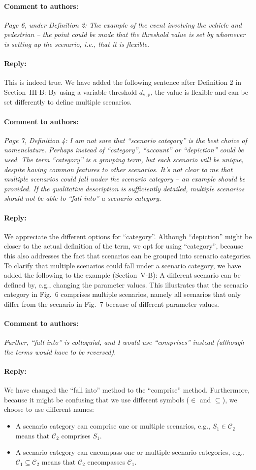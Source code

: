 \documentclass[10pt,final,a4paper,oneside,onecolumn]{article}
\newcommand{\toauthor}{\paragraph*{Comment to authors:} \itshape}
\newcommand{\fromauthor}{\paragraph*{Reply:} \normalfont}
\newcommand{\cstart}{\cbstart\color{red}}
\newcommand{\cend}{\cbend\color{black}}
\newcommand{\distancecondition}{d_{\mathrm{v,p}}}
\newcommand{\scenario}{S}
\newcommand{\scenarioa}{\scenario_{1}}
\newcommand{\scenariofallsinto}{\in}
\newcommand{\scenariocategory}{\mathcal{C}}
\newcommand{\scenariocategorya}{\scenariocategory_{1}}
\newcommand{\scenariocategoryb}{\scenariocategory_{2}}
\newcommand{\scenariocategoryfallsinto}{\subseteq}
\begin{document}
\toauthor Page 6, under Definition 2: The example of the event involving the vehicle and pedestrian -- the point could be made that the threshold value is set by whomever is setting up the scenario, i.e., that it is flexible.

\fromauthor This is indeed true. We have added the following sentence after Definition 2 in Section~III-B: \cstart By using a variable threshold $\distancecondition$, the value is flexible and can be set differently to define multiple scenarios.\cend



\toauthor Page 7, Definition 4: I am not sure that ``scenario category'' is the best choice of nomenclature. Perhaps instead of ``category'', ``account'' or ``depiction'' could be used. The term ``category'' is a grouping term, but each scenario will be unique, despite having common features to other scenarios. It's not clear to me that multiple scenarios could fall under the scenario category -- an example should be provided. If the qualitative description is sufficiently detailed, multiple scenarios should not be able to ``fall into'' a scenario category.

\fromauthor We appreciate the different options for ``category''. Although ``depiction'' might be closer to the actual definition of the term, we opt for using ``category'', because this also addresses the fact that scenarios can be grouped into scenario categories. To clarify that multiple scenarios could fall under a scenario category, we have added the following to the example (Section~V-B): \cstart A different scenario can be defined by, e.g., changing the parameter values. This illustrates that the scenario category in Fig.~6 comprises multiple scenarios, namely all scenarios that only differ from the scenario in Fig.~7 because of different parameter values.\cend

\toauthor Further, ``fall into'' is colloquial, and I would use ``comprises'' instead (although the terms would have to be reversed).

\fromauthor We have changed the ``fall into'' method to the ``\cstart comprise\cend'' method. Furthermore, because it might be confusing that we use different symbols ($\scenariofallsinto$ and $\scenariocategoryfallsinto$), we choose to use different names:
\begin{itemize}
	\item A scenario category can \cstart comprise \cend one or multiple scenarios, e.g., $\scenarioa \scenariofallsinto \scenariocategoryb$ means that $\scenariocategoryb$ \cstart comprises \cend $\scenarioa$.
	\item A scenario category can \cstart encompass \cend one or multiple scenario categories, e.g., $\scenariocategorya \scenariocategoryfallsinto \scenariocategoryb$ means that $\scenariocategoryb$ \cstart encompasses \cend $\scenariocategorya$.
\end{itemize}
\end{document}
